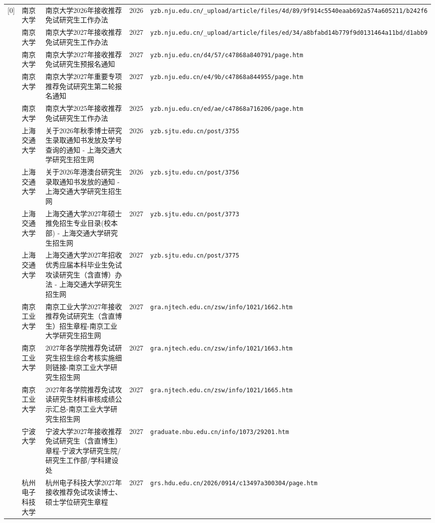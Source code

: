 {\begin{longtable}{@{}p{1.15cm}p{2.9cm}p{6.3cm}p{0.85cm}p{5.0cm}@{}}
[0] & 南京大学 & 南京大学2026年接收推荐免试研究生工作办法 & 2026 & \texttt{yzb.nju.edu.cn/\_upload/article/files/4d/89/9f914c5540eaab692a574a605211/b242f6} \\
[0] & 南京大学 & 南京大学2027年接收推荐免试研究生工作办法 & 2027 & \texttt{yzb.nju.edu.cn/\_upload/article/files/ed/34/a8bfabd14b779f9d0131464a11bd/d1abb9} \\
[0] & 南京大学 & 南京大学2027年接收推荐免试研究生预报名通知 & 2027 & \texttt{yzb.nju.edu.cn/d4/57/c47868a840791/page.htm} \\
[0] & 南京大学 & 南京大学2027年重要专项推荐免试研究生第二轮报名通知 & 2027 & \texttt{yzb.nju.edu.cn/e4/9b/c47868a844955/page.htm} \\
[0] & 南京大学 & 南京大学2025年接收推荐免试研究生工作办法 & 2025 & \texttt{yzb.nju.edu.cn/ed/ae/c47868a716206/page.htm} \\
[0] & 上海交通大学 & 关于2026年秋季博士研究生录取通知书发放及学号查询的通知 - 上海交通大学研究生招生网 & 2026 & \texttt{yzb.sjtu.edu.cn/post/3755} \\
[0] & 上海交通大学 & 关于2026年港澳台研究生录取通知书发放的通知 - 上海交通大学研究生招生网 & 2026 & \texttt{yzb.sjtu.edu.cn/post/3756} \\
[0] & 上海交通大学 & 上海交通大学2027年硕士推免招生专业目录(校本部) - 上海交通大学研究生招生网 & 2027 & \texttt{yzb.sjtu.edu.cn/post/3773} \\
[0] & 上海交通大学 & 上海交通大学2027年招收优秀应届本科毕业生免试攻读研究生（含直博）办法 - 上海交通大学研究生招生网 & 2027 & \texttt{yzb.sjtu.edu.cn/post/3775} \\
[0] & 南京工业大学 & 南京工业大学2027年接收推荐免试研究生（含直博生）招生章程-南京工业大学研究生招生网 & 2027 & \texttt{gra.njtech.edu.cn/zsw/info/1021/1662.htm} \\
[0] & 南京工业大学 & 2027年各学院推荐免试研究生招生综合考核实施细则链接-南京工业大学研究生招生网 & 2027 & \texttt{gra.njtech.edu.cn/zsw/info/1021/1663.htm} \\
[0] & 南京工业大学 & 2027年各学院推荐免试攻读研究生材料审核成绩公示汇总-南京工业大学研究生招生网 & 2027 & \texttt{gra.njtech.edu.cn/zsw/info/1021/1665.htm} \\
[0] & 宁波大学 & 宁波大学2027年接收推荐免试研究生（含直博生）章程-宁波大学研究生院/研究生工作部/学科建设处 & 2027 & \texttt{graduate.nbu.edu.cn/info/1073/29201.htm} \\
[0] & 杭州电子科技大学 & 杭州电子科技大学2027年接收推荐免试攻读博士、硕士学位研究生章程 & 2027 & \texttt{grs.hdu.edu.cn/2026/0914/c13497a300304/page.htm} \\

\end{longtable}}
